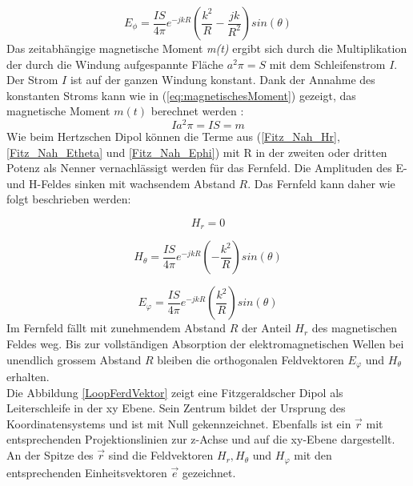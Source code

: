 \begin{equation}
E_\phi= \frac{I S}{4\pi}   e^{-jkR} \left( \frac{k^{2}}{R}  - \frac{jk}{R^{2}} \right) sin(\theta)
\label{Fitz_Nah_Ephi}
\end{equation}
Das zeitabhängige magnetische Moment \textit{m(t)} ergibt sich durch die Multiplikation der durch die Windung aufgespannte Fläche $a^{2}\pi=S$ mit dem  Schleifenstrom $I$. Der Strom $I$ ist auf der ganzen Windung konstant. Dank der Annahme des konstanten Stroms kann wie in (\ref{eq:magnetischesMoment}) gezeigt, das magnetische Moment $m(t)$ berechnet werden \cite{Harrington-TimeHarmonic}: 
\begin{equation}\label{eq:magnetischesMoment}
Ia^{2}\pi=IS=m
\end{equation}
Wie beim Hertzschen Dipol können die Terme aus (\ref{Fitz_Nah_Hr}, \ref{Fitz_Nah_Etheta} und \ref{Fitz_Nah_Ephi}) mit R in der zweiten oder dritten Potenz als Nenner vernachlässigt werden für das Fernfeld. Die Amplituden des E- und H-Feldes sinken mit wachsendem Abstand $R$. Das Fernfeld kann daher wie folgt beschrieben werden:

\begin{equation}
H_r= 0
\end{equation}

\begin{equation}
H_\theta= \frac{I S}{4\pi}   e^{-jkR} \left(- \frac{k^{2}}{R}   \right) sin(\theta)
\end{equation}

\begin{equation}
E_\varphi= \frac{I S}{4\pi}   e^{-jkR} \left( \frac{k^{2}}{R}   \right) sin(\theta)
\end{equation}
Im Fernfeld fällt mit zunehmendem Abstand $R$ der Anteil  $H_r$ des magnetischen Feldes weg. Bis zur vollständigen Absorption der elektromagnetischen Wellen bei unendlich grossem Abstand $R$ bleiben die orthogonalen Feldvektoren $ E_\varphi $ und $ H_\theta $ erhalten.\\
Die Abbildung \ref{LoopFerdVektor} zeigt eine Fitzgeraldscher Dipol als Leiterschleife in der xy Ebene. Sein Zentrum bildet der Ursprung des Koordinatensystems und ist mit Null gekennzeichnet. Ebenfalls ist ein $\vec{r}$ mit entsprechenden Projektionslinien zur z-Achse und auf die xy-Ebene dargestellt. An der Spitze des $\vec{r}$ sind die Feldvektoren $H_{r}, H_{\theta}$ und $H_{\varphi}$ mit den entsprechenden Einheitsvektoren $\vec{e}$ gezeichnet.
\newpage

